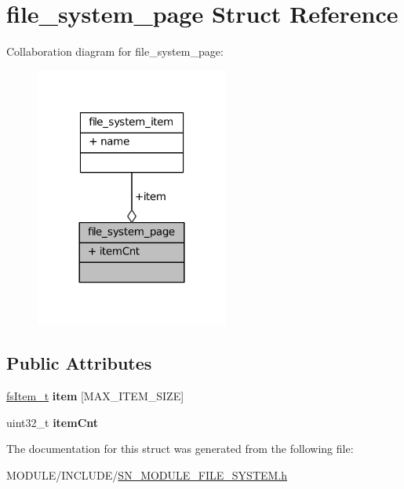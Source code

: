 \hypertarget{structfile__system__page}{}\section{file\+\_\+system\+\_\+page Struct Reference}
\label{structfile__system__page}


Collaboration diagram for file\+\_\+system\+\_\+page\+:\nopagebreak
\begin{figure}[H]
\begin{center}
\leavevmode
\includegraphics[width=180pt]{structfile__system__page__coll__graph}
\end{center}
\end{figure}
\subsection*{Public Attributes}
\begin{DoxyCompactItemize}
\item 
\mbox{\label{structfile__system__page_a0cead090454a32e1bcdc14860d3a41bb}} 
\hyperlink{structfile__system__item}{fs\+Item\+\_\+t} {\bfseries item} \mbox{[}M\+A\+X\+\_\+\+I\+T\+E\+M\+\_\+\+S\+I\+ZE\mbox{]}
\item 
\mbox{\label{structfile__system__page_ad586bea599d55aa2a410dee9feee20f9}} 
uint32\+\_\+t {\bfseries item\+Cnt}
\end{DoxyCompactItemize}


The documentation for this struct was generated from the following file\+:\begin{DoxyCompactItemize}
\item 
M\+O\+D\+U\+L\+E/\+I\+N\+C\+L\+U\+D\+E/\hyperlink{SN__MODULE__FILE__SYSTEM_8h}{S\+N\+\_\+\+M\+O\+D\+U\+L\+E\+\_\+\+F\+I\+L\+E\+\_\+\+S\+Y\+S\+T\+E\+M.\+h}\end{DoxyCompactItemize}
